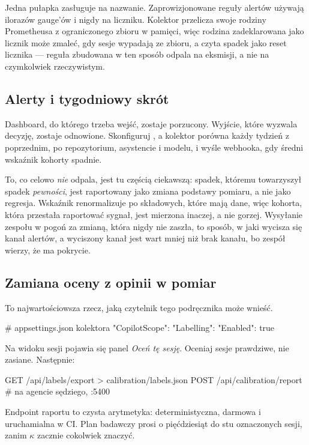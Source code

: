 \documentclass[11pt,a4paper]{article}
\newcommand{\code}[1]{\texttt{\detokenize{#1}}}
\begin{document}
Jedna pułapka zasługuje na nazwanie. Zaprowizjonowane reguły alertów używają
ilorazów gauge'ów i nigdy \code{rate()} na liczniku. Kolektor przelicza swoje
rodziny Prometheusa z ograniczonego zbioru w pamięci, więc rodzina
zadeklarowana jako licznik może zmaleć, gdy sesje wypadają ze zbioru, a
\code{rate()} czyta spadek jako reset licznika --- reguła zbudowana w ten
sposób odpala na eksmisji, a nie na czymkolwiek rzeczywistym.

\subsection{Alerty i tygodniowy skrót}

Dashboard, do którego trzeba wejść, zostaje porzucony. Wyjście, które wyzwala
decyzję, zostaje odnowione. Skonfiguruj \code{CopilotScope:Alerts}, a kolektor
porówna każdy tydzień z poprzednim, po repozytorium, asystencie i modelu, i
wyśle webhooka, gdy średni wskaźnik kohorty spadnie.

To, co celowo \emph{nie} odpala, jest tu częścią ciekawszą: spadek, któremu
towarzyszył spadek \emph{pewności}, jest raportowany jako zmiana podstawy
pomiaru, a nie jako regresja. Wskaźnik renormalizuje po składowych, które mają
dane, więc kohorta, która przestała raportować sygnał, jest mierzona inaczej, a
nie gorzej. Wysyłanie zespołu w pogoń za zmianą, która nigdy nie zaszła, to
sposób, w jaki wycisza się kanał alertów, a wyciszony kanał jest wart mniej niż
brak kanału, bo zespół wierzy, że ma pokrycie.

\subsection{Zamiana oceny z opinii w pomiar}

To najwartościowsza rzecz, jaką czytelnik tego podręcznika może wnieść.

\begin{shell}
# appsettings.json kolektora
"CopilotScope": { "Labelling": { "Enabled": true } }
\end{shell}

Na widoku sesji pojawia się panel \emph{Oceń tę sesję}. Oceniaj sesje
prawdziwe, nie zasiane. Następnie:

\begin{shell}
GET /api/labels/export > calibration/labels.json
POST /api/calibration/report   # na agencie sędziego, :5400
\end{shell}

Endpoint raportu to czysta arytmetyka: deterministyczna, darmowa i uruchamialna
w CI. Plan badawczy prosi o pięćdziesiąt do stu oznaczonych sesji, zanim
$\kappa$ zacznie cokolwiek znaczyć.
\end{document}
